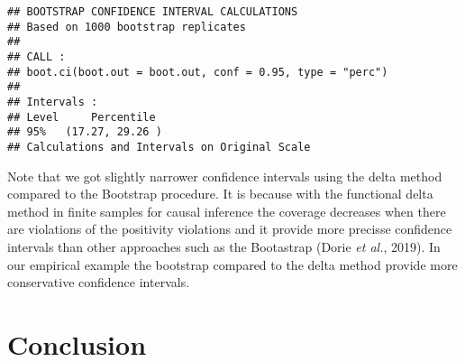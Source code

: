 \documentclass[]{article}
\newenvironment{Shaded}{\begin{snugshade}}{\end{snugshade}}
\newcommand{\CommentTok}[1]{\textcolor[rgb]{0.56,0.35,0.01}{\textit{#1}}}
\newcommand{\DataTypeTok}[1]{\textcolor[rgb]{0.13,0.29,0.53}{#1}}
\newcommand{\DecValTok}[1]{\textcolor[rgb]{0.00,0.00,0.81}{#1}}
\newcommand{\FloatTok}[1]{\textcolor[rgb]{0.00,0.00,0.81}{#1}}
\newcommand{\KeywordTok}[1]{\textcolor[rgb]{0.13,0.29,0.53}{\textbf{#1}}}
\newcommand{\NormalTok}[1]{#1}
\newcommand{\OperatorTok}[1]{\textcolor[rgb]{0.81,0.36,0.00}{\textbf{#1}}}
\newcommand{\StringTok}[1]{\textcolor[rgb]{0.31,0.60,0.02}{#1}}
\begin{document}
\begin{Shaded}
\end{Shaded}

\begin{verbatim}
## BOOTSTRAP CONFIDENCE INTERVAL CALCULATIONS
## Based on 1000 bootstrap replicates
## 
## CALL : 
## boot.ci(boot.out = boot.out, conf = 0.95, type = "perc")
## 
## Intervals : 
## Level     Percentile     
## 95%   (17.27, 29.26 )  
## Calculations and Intervals on Original Scale
\end{verbatim}

Note that we got slightly narrower confidence intervals using the delta
method compared to the Bootstrap procedure. It is because with the
functional delta method in finite samples for causal inference the
coverage decreases when there are violations of the positivity
violations and it provide more precisse confidence intervals than other
approaches such as the Bootastrap (Dorie \emph{et al.}, 2019). In our
empirical example the bootstrap compared to the delta method provide
more conservative confidence intervals.

\hypertarget{conclusion}{%
\section{Conclusion}\label{conclusion}}
\end{document}
